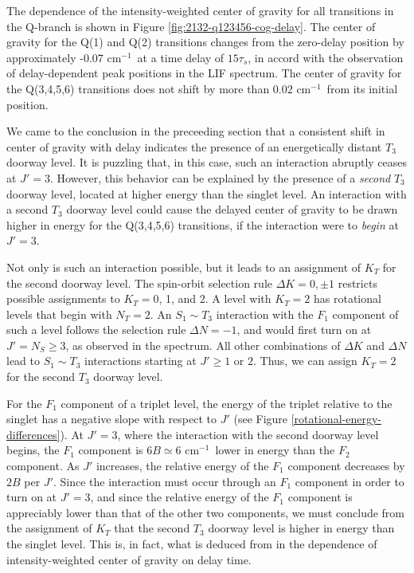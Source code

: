 \documentclass[12pt]{mitthesis}
\newcommand{\rcm}{cm$^{-1}$}
\begin{document}
The dependence of the intensity-weighted center of gravity for all
transitions in the Q-branch is shown in Figure
\ref{fig:2132-q123456-cog-delay}.  The center of gravity for the Q(1)
and Q(2) transitions changes from the zero-delay position by
approximately -0.07 \rcm\ at a time delay of $15\tau_s$, in accord
with the observation of delay-dependent peak positions in the LIF
spectrum.  The center of gravity for the Q(3,4,5,6) transitions does
not shift by more than 0.02 \rcm\ from its initial position.

We came to the conclusion in the preceeding section that a consistent
shift in center of gravity with delay indicates the presence of an
energetically distant $T_3$ doorway level.  It is puzzling that, in
this case, such an interaction abruptly ceases at
$J'=3$.  However, this behavior can be explained by the presence of a
\emph{second} $T_3$ doorway level, located at higher energy than the
singlet level.  An interaction with a second $T_3$ doorway level could
cause the delayed center of gravity to be drawn higher in energy for
the Q(3,4,5,6) transitions, if the interaction were to \emph{begin} at
$J'=3$.

Not only is such an interaction possible, but it leads to an
assignment of $K_T$ for the second doorway level.  The spin-orbit
selection rule $\Delta K = 0, \pm 1$ restricts possible assignments to
$K_T=$0, 1, and 2.  A level with $K_T=2$ has rotational levels that
begin with $N_T=2$.  An $S_1 \sim T_3$ interaction with the $F_1$
component of such a level follows the selection rule $\Delta N = -1$,
and would first turn on at $J'=N_S \geq 3$, as observed in the spectrum.
All other combinations of $\Delta K$ and $\Delta N$ lead to $S_1 \sim
T_3$ interactions starting at $J' \geq 1$ or $2$.  Thus, we can 
assign $K_T=2$ for the second $T_3$ doorway level.

For the $F_1$ component of a triplet level, the energy of the triplet
relative to the singlet has a negative slope with respect to $J'$ (see
Figure \ref{rotational-energy-differences}).  At $J'=3$, where the
interaction with the second doorway level begins, the $F_1$ component
is $6B \simeq 6$ \rcm\ lower in energy than the $F_2$ component.  As
$J'$ increases, the relative energy of the $F_1$ component decreases
by $2B$ per $J'$.  Since the interaction must occur through an $F_1$
component in order to turn on at $J'=3$, and since the relative energy
of the $F_1$ component is appreciably lower than that of the other two
components, we must conclude from the assignment of $K_T$ that the
second $T_3$ doorway level is higher in energy than the singlet level.
This is, in fact, what is deduced from in the dependence of
intensity-weighted center of gravity on delay time.
\end{document}
